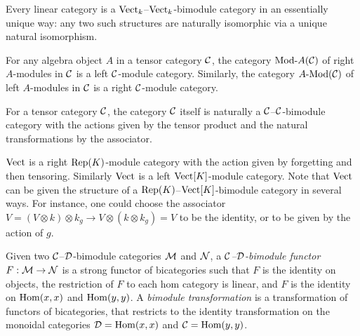 \documentclass{amsart}
\begin{document}
\begin{example}
	Every linear category is a $\mathrm{Vect}_k$--$\mathrm{Vect}_k$-bimodule category in an essentially unique way: any two such structures are naturally isomorphic via a unique natural isomorphism.
\end{example}

\begin{example} \label{ex:ModulesAreModules}
	For any algebra object $A$ in a tensor category $\mathcal C$, the category $\Mod{}{A}(\cC)$ of right $A$-modules in $\mathcal C$ is a left $\mathcal C$-module category.  Similarly, the category $\Mod{A}{}(\cC)$ of left $A$-modules in $\mathcal C$ is a right $\mathcal C$-module category.
\end{example}

\begin{example}
For a tensor category $\mathcal C$, the category $\mathcal C$ itself is naturally a $\mathcal C$--$\mathcal C$-bimodule category with the actions given by the tensor product and the natural transformations by the associator.
\end{example}

\begin{example}
$\mathrm{Vect}$ is a right $\mathrm{Rep}(K)$-module category with the action given by forgetting and then tensoring.  Similarly $\mathrm{Vect}$ is a left $\mathrm{Vect}[K]$-module category.  Note that $\mathrm{Vect}$ can be given the structure of a $\mathrm{Rep}(K)$--$\mathrm{Vect}[K]$-bimodule category in several ways.  For instance, one could choose the associator $V = (V \otimes k) \otimes k_g \rightarrow V \otimes (k \otimes k_g) = V$ to be the identity, or to be given by the action of $g$.
\end{example}

\begin{definition}		
Given two $\mathcal C$--$\mathcal D$-bimodule categories $\mathcal M$ and $\mathcal N$, a {\em $\mathcal C$--$\mathcal D$-bimodule functor} $F:\mathcal M \to \mathcal N$ is a strong functor of bicategories such that 
		 $F$ is the identity on objects,
		  the restriction of $F$ to each hom category is linear,
		 and $F$ is the identity on $\operatorname{Hom}(x,x)$ and $\operatorname{Hom}(y,y)$.
	A {\em bimodule transformation} is a transformation of functors of bicategories, that restricts to the identity transformation on the monoidal categories $\mathcal D = \operatorname{Hom}(x,x)$ and $\mathcal C = \operatorname{Hom}(y,y)$.
	 
\end{definition} %
	
\end{document}

